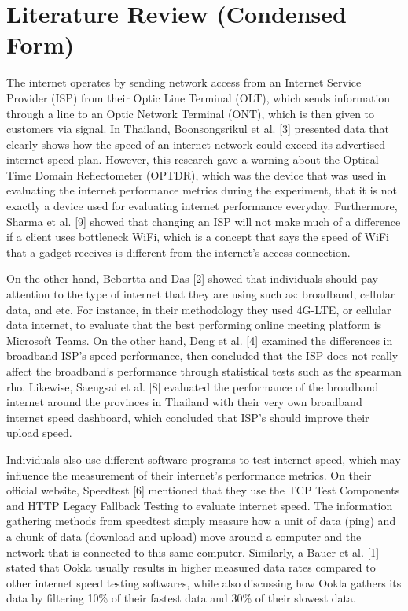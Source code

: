 \documentclass[conference]{IEEEtran}
\begin{document}
\section{Literature Review (Condensed Form)}

The internet operates by sending network access from an Internet Service Provider (ISP) from their Optic Line Terminal (OLT), which sends information through a line to an Optic Network Terminal (ONT), which is then given to customers via signal. In Thailand, Boonsongsrikul et al. [3] presented data that clearly shows how the speed of an internet network could exceed its advertised internet speed plan. However, this research gave a warning about the Optical Time Domain Reflectometer (OPTDR), which was the device that was used in evaluating the internet performance metrics during the experiment, that it is not exactly a device used for evaluating internet performance everyday. Furthermore, Sharma et al. [9] showed that changing an ISP will not make much of a difference if a client uses bottleneck WiFi, which is a concept that says the speed of WiFi that a gadget receives is different from the internet's access connection.

On the other hand, Bebortta and Das [2] showed that individuals should pay attention to the type of internet that they are using such as: broadband, cellular data, and etc. For instance, in their methodology they used 4G-LTE, or cellular data internet, to evaluate that the best performing online meeting platform is Microsoft Teams. On the other hand, Deng et al. [4] examined the differences in broadband ISP's speed performance, then concluded that the ISP does not really affect the broadband's performance through statistical tests such as the spearman rho. Likewise, Saengsai et al. [8] evaluated the performance of the broadband internet around the provinces in Thailand with their very own broadband internet speed dashboard, which concluded that ISP's should improve their upload speed.

Individuals also use different software programs to test internet speed, which may influence the measurement of their internet's performance metrics. On their official website, Speedtest [6] mentioned that they use the TCP Test Components and HTTP Legacy Fallback Testing to evaluate internet speed. The information gathering methods from speedtest simply measure how a unit of data (ping) and a chunk of data (download and upload) move around a computer and the network that is connected to this same computer. Similarly, a Bauer et al. [1] stated that Ookla usually results in higher measured data rates compared to other internet speed testing softwares, while also discussing how Ookla gathers its data by filtering 10\% of their fastest data and 30\% of their slowest data.
\end{document}
